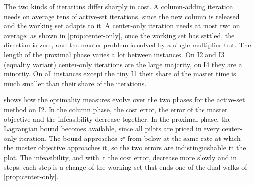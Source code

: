 \begin{table}[ht]
\centering
\small
\renewcommand{\arraystretch}{1.15}
\setlength{\tabcolsep}{4pt}
\caption{Column-adding and center-only iterations of the active-set method (dense
factorization). ``inner iter.'' counts the iterations of the active-set method per master
problem.}
\label{tab:phases}
\end{table}

The two kinds of iterations differ sharply in cost. A column-adding iteration needs on
average tens of active-set iterations, since the new column is released and the working set
adapts to it. A center-only iteration needs at most two on average: as shown in
\cref{prop:center-only}, once the working set has settled, the direction is zero, and the
master problem is solved by a single multiplier test. The length of the proximal phase
varies a lot between instances. On I2 and I3 (equality variant) center-only iterations are
the large majority, on I4 they are a minority. On all instances except the tiny I1 their share
of the master time is much smaller than their share of the iterations.

 shows how the optimality measures evolve over the two phases for the
active-set method on I2. In the column phase, the cost error, the error of the master
objective and the infeasibility decrease together. In the proximal phase, the Lagrangian
bound becomes available, since all pilots are priced in every center-only iteration. The
bound approaches $z^\star$ from below at the same rate at which the master objective
approaches it, so the two errors are indistinguishable in the plot. The infeasibility, and
with it the cost error, decrease more slowly and in steps: each step is a change of the
working set that ends one of the dual walks of \cref{prop:center-only}.

